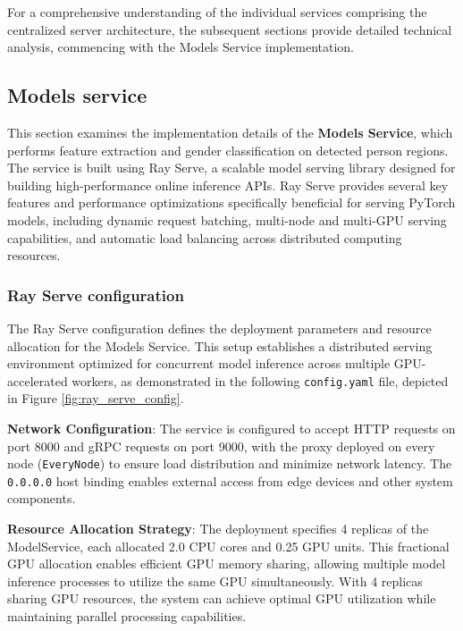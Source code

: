 For a comprehensive understanding of the individual services comprising the centralized server architecture, the subsequent sections provide detailed technical analysis, commencing with the Models Service implementation.

\subsection{Models service}

This section examines the implementation details of the \textbf{Models Service}, which performs feature extraction and gender classification on detected person regions. The service is built using Ray Serve, a scalable model serving library designed for building high-performance online inference APIs. Ray Serve provides several key features and performance optimizations specifically beneficial for serving PyTorch models, including dynamic request batching, multi-node and multi-GPU serving capabilities, and automatic load balancing across distributed computing resources.

\subsubsection{Ray Serve configuration}

The Ray Serve configuration defines the deployment parameters and resource allocation for the Models Service. This setup establishes a distributed serving environment optimized for concurrent model inference across multiple GPU-accelerated workers, as demonstrated in the following \texttt{config.yaml} file, depicted in Figure \ref{fig:ray_serve_config}.


\textbf{Network Configuration}: The service is configured to accept HTTP requests on port 8000 and gRPC requests on port 9000, with the proxy deployed on every node (\texttt{EveryNode}) to ensure load distribution and minimize network latency. The \texttt{0.0.0.0} host binding enables external access from edge devices and other system components.

\textbf{Resource Allocation Strategy}: The deployment specifies 4 replicas of the ModelService, each allocated 2.0 CPU cores and 0.25 GPU units. This fractional GPU allocation enables efficient GPU memory sharing, allowing multiple model inference processes to utilize the same GPU simultaneously. With 4 replicas sharing GPU resources, the system can achieve optimal GPU utilization while maintaining parallel processing capabilities.


